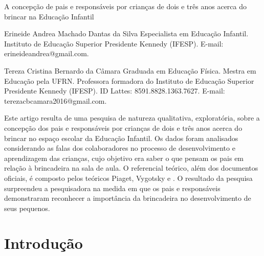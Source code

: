 \begin{refsection}
    \renewcommand{\thefigure}{\arabic{figure}}
    
    \chapterOneLine
    {A concepção de pais e responsáveis por crianças de dois e três anos acerca do brincar na Educação Infantil}
    \label{chap:concepcao-pais-respo}

    \articleAuthor
    {Erineide Andrea Machado Dantas da Silva}
    {Especialista em Educação Infantil.  Instituto de Educação Superior Presidente Kennedy (IFESP). E-mail: erineideandrea@gmail.com.}
    
    \articleAuthor
    {Tereza Cristina Bernardo da Câmara}
    {Graduada em Educação Física. Mestra em Educação pela UFRN. Professora formadora do Instituto de Educação Superior Presidente Kennedy (IFESP). ID Lattes: 8591.8828.1363.7627. E-mail: terezacbcamara2016@gmail.com.}
    
    \begin{galoResumo}
        Este artigo resulta de uma pesquisa de natureza qualitativa, exploratória, sobre a concepção dos pais e responsáveis por crianças de dois e três anos acerca do brincar no espaço escolar da Educação Infantil. Os dados foram analisados considerando as falas dos colaboradores no processo de desenvolvimento e aprendizagem das crianças, cujo objetivo era saber o que pensam os pais em relação à brincadeira na sala de aula. O referencial teórico, além dos documentos oficiais, é composto pelos teóricos Piaget, Vygotsky e \textcite{KISHIMOTO1999Jogo, KISHIMOTO2002Brincar}. O resultado da pesquisa surpreendeu a pesquisadora na medida em que os pais e responsáveis demonstraram reconhecer a importância da brincadeira no desenvolvimento de seus pequenos.
    \end{galoResumo}
    


    \section{Introdução}


\end{refsection}
